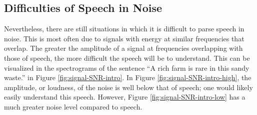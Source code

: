 \documentclass[dissertation,copyright]{uathesis}
\begin{document}
\subsection{Difficulties of Speech in Noise}

Nevertheless, there are still situations in which it is difficult to parse speech in noise.  This is most often due to signals with energy at similar frequencies that overlap.  The greater the amplitude of a signal at frequencies overlapping with those of speech, the more difficult the speech will be to understand.  This can be visualized in the spectrograms of the sentence ``A rich farm is rare in this sandy waste.'' in Figure \ref{fig:signal-SNR-intro}.  In Figure \ref{fig:signal-SNR-intro-high}, the amplitude, or loudness, of the noise is well below that of speech; one would likely easily understand this speech.  However, Figure \ref{fig:signal-SNR-intro-low} has a much greater noise level compared to speech.
\end{document}

